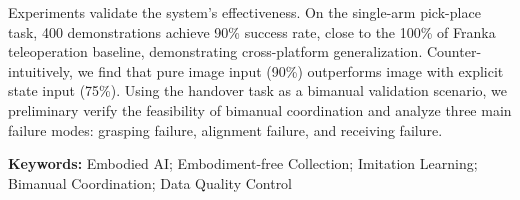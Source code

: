 Experiments validate the system's effectiveness. On the single-arm pick-place task, 400 demonstrations achieve 90\% success rate, close to the 100\% of Franka teleoperation baseline, demonstrating cross-platform generalization. Counter-intuitively, we find that pure image input (90\%) outperforms image with explicit state input (75\%). Using the handover task as a bimanual validation scenario, we preliminary verify the feasibility of bimanual coordination and analyze three main failure modes: grasping failure, alignment failure, and receiving failure.

\vspace{0.5cm}
\noindent\textbf{Keywords:} Embodied AI; Embodiment-free Collection; Imitation Learning; Bimanual Coordination; Data Quality Control

\newpage
